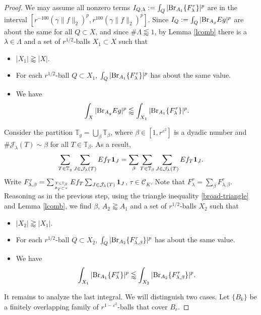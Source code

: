 \documentclass{amsart}%
\numberwithin{equation}{section}
\newcommand{\be}{\beta}
\newcommand{\e}{\varepsilon}
\newcommand{\la}{\lambda}
\newcommand{\cj}{\mathcal J}
\newcommand{\ZT}{\mathbb{T}}
\newcommand{\Id}{{\bf{1}}}
\newcommand{\cC}{{\mathcal C}}
\newcommand{\Br}{{\rm{Br}}}
\newcommand{\1}{\mathbbm{1}}
\begin{document}
\begin{proof}
    We may assume all nonzero terms $I_{Q,\lambda}:=\int_{Q}|\Br_{A_1} \{F_\lambda^{\tau}\}|^p$ are in the interval $[r^{-100}(\gamma\|f\|_2)^p,r^{100}(\gamma\|f\|_2)^p]$.    
	Since $I_Q:=\int_{Q}|\Br_{A_g} Eg|^p$ are about the same for all $Q\subset X$, and since $\#\Lambda\lessapprox 1$, by Lemma \ref{lcomb} there is a $\la\in\Lambda$ and a set of $r^{1/2}$-balls $X_1\subset X$ such that 
	\begin{itemize}
		\item $|X_1|\gtrapprox|X|$.
		\item For each $r^{1/2}$-ball $Q\subset X_1$, 
        $\int_{Q}|\Br_{A_1} \{F_\lambda^{\tau}\}|^p
        $ has about the same value.
		\item We have
		\begin{equation}			
			\int_{X}|\Br_{A_g} Eg|^p\lessapprox\int_{X_1}|\Br_{A_1} \{F_\lambda^{\tau}\}|^p.
		\end{equation}
	\end{itemize}
	Consider the partition $\ZT_g=\bigcup_\be\ZT_{\be}$, where $\be\in[1,r^{\e^2}]$ is a dyadic number and $\#\cj_\la(T)\sim\be$ for all $T\in\ZT_{\be}$. 
	As a result, 
	\begin{equation}
		\nonumber
		\sum_{T\in\ZT_g}\sum_{J\in\cj_\la(T)}Ef_{T}\Id_J=\sum_\be\sum_{T\in\ZT_{\be}}\sum_{J\in\cj_\la(T)}Ef_{T}\Id_J.    
	\end{equation}Write $F_{\lambda,\beta}^\tau=\sum_{T\in\ZT_\beta\atop{\theta_T\subset\tau}}Ef_{T}\sum_{J\in\cj_\la(T)}\Id_J$, $\tau\in\cC_K$. Note that $F_\lambda^\tau=\sum_{\beta}F_{\lambda,\beta}^{\tau}$.
	Reasoning as in the previous step, using the triangle  inequality \eqref{broad-triangle} and  Lemma \ref{lcomb}, 
     we find  $\be$, $A_2\gtrapprox A_1$ and a set of $r^{1/2}$-balls $X_2$ such that 
	\begin{itemize}
		\item $|X_2|\gtrapprox|X_1|$.
		\item For each $r^{1/2}$-ball $Q\subset X_2$, $\int_{Q}|\Br_{A_2} \{F_{\lambda,\beta}^{\tau}\}|^p$ has about the same value.
		\item We have
		\begin{equation}
			\label{reduction-2}
			\int_{X_1}|\Br_{A_1} \{F_\lambda^{\tau}\}|^p\lessapprox\int_{X_2}|\Br_{A_2} \{F_{\lambda,\beta}^{\tau}\}|^p .
		\end{equation}
	\end{itemize}
	
	\smallskip
    
    It remains to analyze the last integral. We will distinguish two cases.
	Let $\{B_k\}$ be a finitely overlapping family of $r^{1-\e^2}$-balls that cover $B_r$. 
	\medskip
	

\end{proof}
\end{document}
